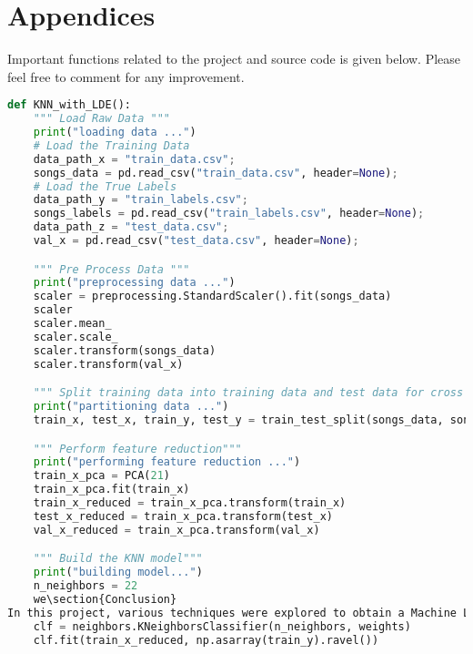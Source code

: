 \documentclass[journal]{IEEEtran}
\begin{document}
\newpage

\section{Appendices}
Important functions related to the project and source code is given below. Please feel free to comment for any improvement.
\begin{lstlisting}[language=Python, caption= KNN Clustering with Low Dimensional Embedding]
def KNN_with_LDE():
    """ Load Raw Data """
    print("loading data ...")
    # Load the Training Data
    data_path_x = "train_data.csv";
    songs_data = pd.read_csv("train_data.csv", header=None);
    # Load the True Labels
    data_path_y = "train_labels.csv";
    songs_labels = pd.read_csv("train_labels.csv", header=None);
    data_path_z = "test_data.csv";
    val_x = pd.read_csv("test_data.csv", header=None);

    """ Pre Process Data """
    print("preprocessing data ...")
    scaler = preprocessing.StandardScaler().fit(songs_data)
    scaler
    scaler.mean_
    scaler.scale_
    scaler.transform(songs_data)
    scaler.transform(val_x)

    """ Split training data into training data and test data for cross validation """
    print("partitioning data ...")
    train_x, test_x, train_y, test_y = train_test_split(songs_data, songs_labels, train_size=0.8, random_state=0);

    """ Perform feature reduction"""
    print("performing feature reduction ...")
    train_x_pca = PCA(21)
    train_x_pca.fit(train_x)
    train_x_reduced = train_x_pca.transform(train_x)
    test_x_reduced = train_x_pca.transform(test_x)
    val_x_reduced = train_x_pca.transform(val_x)

    """ Build the KNN model"""
    print("building model...")
    n_neighbors = 22
    we\section{Conclusion}
In this project, various techniques were explored to obtain a Machine Learning model that scales to a moderately large dataset with high dimensionality. The K Nearest Neighbours with Low Dimensional Embedding approach was tested first, to see if any gains could be made by reducing the dataset to a lower dimensional space that was most representative of the variation inside the dataset. The technique yielded results that were counter-intuitive, which indicated that the majority of dimensions present inside the dataset did contain useful information that got lost with the reduction. After this deduction, we switched to logistic regression on the entire dataset, as it was. First, Multinomial Logistic Regression was applied, which yielded much improved accuracy and log-loss results. Furthermore, an OVA classification approach with logistic regression learner was also implemented, yielding comparable results to the MLR approach. In our experiments, OVA yielded marginally better results for the accuracy metric, whereas MLR yielded better results for the log-loss metric. \parights = 'uniform'
    clf = neighbors.KNeighborsClassifier(n_neighbors, weights)
    clf.fit(train_x_reduced, np.asarray(train_y).ravel())


\end{lstlisting}
\end{document}
